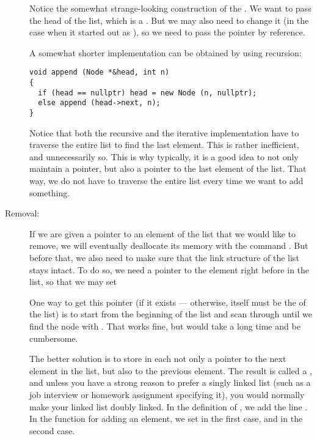 \begin{description}
Notice the somewhat strange-looking construction of the
.
We want to pass the head of the list, which is a .
But we may also need to change it (in the case when it started out as
), so we need to pass the pointer by reference.

A somewhat shorter implementation can be obtained by using recursion:
\begin{verbatim}
void append (Node *&head, int n)
{
  if (head == nullptr) head = new Node (n, nullptr);
  else append (head->next, n);
}
\end{verbatim}

Notice that both the recursive and the iterative implementation have
to traverse the entire list to find the last element.
This is rather inefficient, and unnecessarily so.
This is why typically,
it is a good idea to not only maintain a  pointer,
but also a  pointer to the last element of the list.
That way, we do not have to traverse the entire list every time we
want to add something.

\item[Removal:] 
If we are given a pointer  to an
element of the list that we would like to remove,
we will eventually deallocate its memory with
the command . 
But before that, we also need to make sure that the link structure of
the list stays intact.
To do so, we need a pointer  to the element right before
 in the list,
so that we may set  

One way to get this pointer (if it exists --- otherwise,
 itself must be the  of the list) is to
start from the beginning of the list and scan through until we find
the node  with . 
That works fine, but would take a long time and be cumbersome.

The better solution is to store in each  not only
a pointer to the next element in the list,
but also to the previous element.
The result is called a , and unless
you have a strong reason to prefer a singly linked list
(such as a job interview or homework assignment specifying it), 
you would normally make your linked list doubly linked. 
In the definition of , we add the line .
In the function for adding an element, we set 
 in the first case,
and  in the second case.


\end{description}
